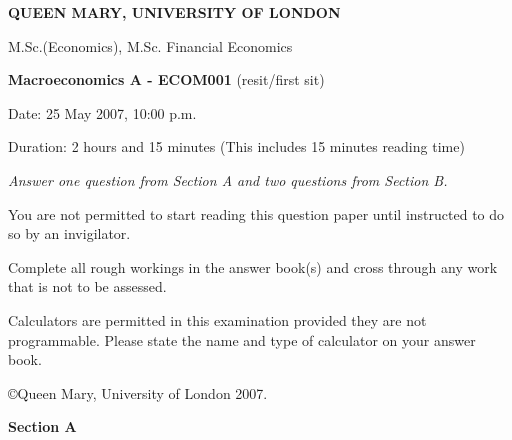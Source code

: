 \documentclass[a4paper,12pt]{article}
\begin{document}
\noindent\Large {\textbf{QUEEN MARY, UNIVERSITY OF LONDON }}
\newline 

\noindent \large {M.Sc.(Economics), M.Sc. Financial Economics\vspace{0.4cm} }

\noindent\textbf{\large Macroeconomics A - ECOM001} (resit/first sit)\vspace{0.4cm}

\noindent \large {Date: 25 May  2007, 10:00 p.m.

\noindent Duration: 2 hours and 15 minutes (This includes 15 minutes
reading time)}

\vspace{4cm}

\normalsize 
\em
\noindent  Answer one question from Section A and two
questions from Section B. 

\bigskip
\noindent You are not permitted to start reading this question paper
until instructed to do so by an invigilator.

\bigskip
\noindent Complete all rough workings in the answer
book(s) and cross through any work that is not to be assessed.

\bigskip
\noindent Calculators are permitted in this examination
provided they are not programmable. Please state the name and type
of calculator on your answer book.
\em

\vfill \noindent \copyright Queen Mary, University of London
2007.\newpage

\noindent \textbf{Section A} 
\end{document}
